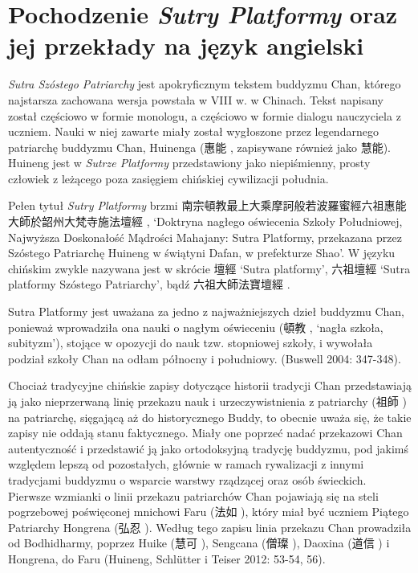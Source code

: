 \section{Pochodzenie \textit{Sutry Platformy} oraz jej przekłady na język angielski}
\textit{Sutra Szóstego Patriarchy} jest apokryficznym tekstem buddyzmu Chan, którego najstarsza zachowana wersja powstała w VIII w. w Chinach. Tekst napisany został częściowo w formie monologu, a częściowo w formie dialogu nauczyciela z uczniem. Nauki w niej zawarte miały został wygłoszone przez legendarnego patriarchę buddyzmu Chan, Huinenga (惠能 , zapisywane również jako 慧能). %
Huineng jest w \textit{Sutrze Platformy} przedstawiony jako niepiśmienny, prosty człowiek z leżącego poza zasięgiem chińskiej cywilizacji południa.

Pełen tytuł \textit{Sutry Platformy} brzmi 南宗頓教最上大乘摩訶般若波羅蜜經六祖惠能大師於韶州大梵寺施法壇經 , `Doktryna nagłego oświecenia Szkoły Południowej, Najwyższa Doskonałość Mądrości Mahajany: Sutra Platformy, przekazana przez Szóstego Patriarchę Huineng w świątyni Dafan, w prefekturze Shao'. W języku chińskim zwykle nazywana jest w skrócie 壇經  `Sutra platformy', 六祖壇經  `Sutra platformy Szóstego Patriarchy', bądź 六祖大師法寶壇經 .

Sutra Platformy jest uważana za jedno z najważniejszych dzieł buddyzmu Chan, ponieważ wprowadziła ona nauki o nagłym oświeceniu (頓教 , `nagła szkoła, subityzm'), stojące w opozycji do nauk tzw. stopniowej szkoły, i wywołała podział szkoły Chan na odłam północny i południowy. %
(Buswell 2004: 347-348).%

Chociaż tradycyjne chińskie zapisy dotyczące historii tradycji Chan przedstawiają ją jako nieprzerwaną linię przekazu nauk i urzeczywistnienia z patriarchy (祖師 ) na patriarchę, sięgającą aż do historycznego Buddy, to obecnie uważa się, że takie zapisy nie oddają stanu faktycznego. Miały one poprzeć nadać przekazowi Chan autentyczność i przedstawić ją jako ortodoksyjną tradycję buddyzmu, pod jakimś względem lepszą od pozostałych, głównie w ramach rywalizacji z innymi tradycjami buddyzmu o wsparcie warstwy rządzącej oraz osób świeckich. Pierwsze wzmianki o linii przekazu patriarchów Chan pojawiają się na steli pogrzebowej poświęconej mnichowi Faru (法如 ), który miał być uczniem Piątego Patriarchy Hongrena (弘忍 \pinyin{}). Według tego zapisu linia przekazu Chan prowadziła od Bodhidharmy, poprzez Huike (慧可 ), Sengcana (僧璨 ), Daoxina (道信 ) i Hongrena, do Faru (Huineng, Schlütter i Teiser 2012: 53-54, 56).

